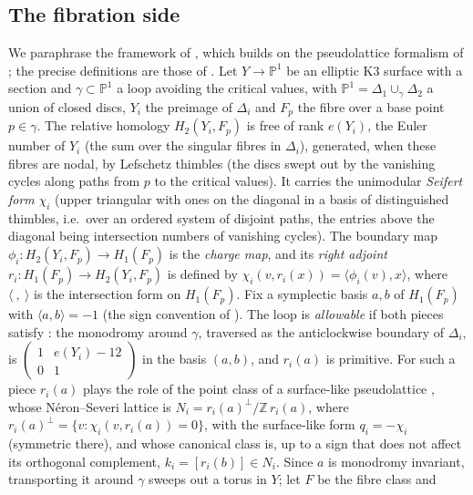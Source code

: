 \documentclass[12pt]{article}
\newcommand{\Z}{\mathbb Z}
\newcommand{\PP}{\mathbb P}
\theoremstyle{definition}
\theoremstyle{remark}
\begin{document}
\subsection{The fibration side}\label{sec:fibside}

We paraphrase the framework of \cite[\S\S2,4,5]{GT}, which builds on
the pseudolattice formalism of \cite{Kuz,HT}; the precise definitions
are those of \cite{GT}. Let \(Y\to\PP^1\) be an elliptic K3 surface
with a section and \(\gamma\subset\PP^1\) a loop avoiding the critical
values, with \(\PP^1=\Delta_1\cup_\gamma\Delta_2\) a union of closed
discs, \(Y_i\) the preimage of \(\Delta_i\) and \(F_p\) the fibre over
a base point \(p\in\gamma\). The relative homology \(H_2(Y_i,F_p)\) is
free of rank \(e(Y_i)\), the Euler number of \(Y_i\) (the sum over the
singular fibres in \(\Delta_i\)), generated, when these fibres are nodal,
by Lefschetz thimbles (the discs swept out by the vanishing cycles
along paths from \(p\) to the critical values). It carries the
unimodular \emph{Seifert form} \(\chi_i\) (upper triangular with ones
on the diagonal in a basis of distinguished thimbles, i.e.\ over an
ordered system of disjoint paths, the entries above the diagonal being
intersection numbers of vanishing cycles). The boundary map
\(\phi_i\colon H_2(Y_i,F_p)\to H_1(F_p)\) is the \emph{charge map}, and
its \emph{right adjoint} \(r_i\colon H_1(F_p)\to H_2(Y_i,F_p)\) is
defined by \(\chi_i(v,r_i(x))=\langle\phi_i(v),x\rangle\), where
\(\langle\ ,\ \rangle\) is the intersection form on \(H_1(F_p)\). Fix a
symplectic basis \(a,b\) of \(H_1(F_p)\) with \(\langle a,b\rangle=-1\)
(the sign convention of \cite{GT}). The loop is \emph{allowable}
\cite[Definition~4.11]{GT} if both pieces satisfy
\cite[Assumption~4.9]{GT}: the monodromy around \(\gamma\), traversed
as the anticlockwise boundary of \(\Delta_i\), is
\(\left(\begin{smallmatrix}1&e(Y_i)-12\\0&1\end{smallmatrix}\right)\)
in the basis \((a,b)\), and \(r_i(a)\) is primitive. For such a piece
\(r_i(a)\) plays the role of the point class of a surface-like
pseudolattice \cite[\S\S2,4]{GT}, whose N\'eron--Severi lattice is
\(N_i=r_i(a)^\perp/\Z\,r_i(a)\), where
\(r_i(a)^\perp=\{v:\chi_i(v,r_i(a))=0\}\), with the surface-like form
\(q_i=-\chi_i\) (symmetric there), and whose canonical class is, up to a sign that does
not affect its orthogonal complement, \(k_i=[r_i(b)]\in N_i\). Since
\(a\) is monodromy invariant, transporting it around \(\gamma\) sweeps
out a torus in \(Y\); let \(F\) be the fibre class and
\end{document}
